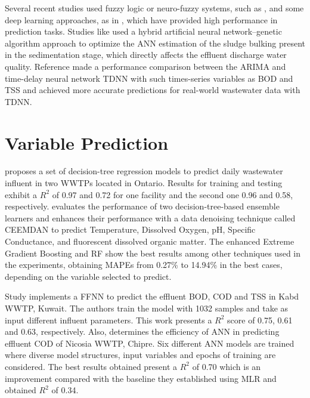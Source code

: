 Several recent studies used fuzzy logic or neuro-fuzzy systems, such as \cite{Nourani2018,Nadiri2018,Han2018}, and some deep learning approaches, as in \cite{Guo2015,Alsina2018,Dairi2019}, which have provided high performance in prediction tasks. Studies like \cite{Bagheri2015} used a hybrid artificial neural network–genetic algorithm approach to optimize the \ac{ANN} estimation of the sludge bulking present in the sedimentation stage, which directly affects the effluent discharge water quality. Reference \cite{Dellana2009} made a performance comparison between the \ac{ARIMA} and time-delay neural network \ac{TDNN} with such times-series variables as \ac{BOD} and \ac{TSS} and achieved more accurate predictions for real-world wastewater data with \ac{TDNN}.

\section{Variable Prediction}
\label{s:RelatedWorks-variablePrediction}

\cite{Zhou2019} proposes a set of decision-tree regression models to predict daily wastewater influent in two \ac{WWTP}s located in Ontario. Results for training and testing exhibit a \begin{math}R^2\end{math} of 0.97 and 0.72 for one facility and the second one 0.96 and 0.58, respectively. \cite{Lu2020} evaluates the performance of two decision-tree-based ensemble learners and enhances their performance with a data denoising technique called \ac{CEEMDAN} to predict Temperature, Dissolved Oxygen, pH, Specific Conductance, and fluorescent dissolved organic matter. The enhanced Extreme Gradient Boosting and \ac{RF} show the best results among other techniques used in the experiments, obtaining \ac{MAPE}s from 0.27\% to 14.94\% in the best cases, depending on the variable selected to predict.

Study \cite{Alsulaili2021} implements a \ac{FFNN} to predict the effluent \ac{BOD}, \ac{COD} and \ac{TSS} in Kabd \ac{WWTP}, Kuwait. The authors train the model with 1032 samples and take as input different influent parameters. This work presents a \begin{math}R^2\end{math} score of 0.75, 0.61 and 0.63, respectively. Also, \cite{Abba2017} determines the efficiency of \ac{ANN} in predicting effluent \ac{COD} of Nicosia \ac{WWTP}, Chipre. Six different \ac{ANN} models are trained where diverse model structures, input variables and epochs of training are considered. The best results obtained present a \begin{math}R^2\end{math} of 0.70 which is an improvement compared with the baseline they established using \ac{MLR} and obtained \begin{math}R^2\end{math} of 0.34.

